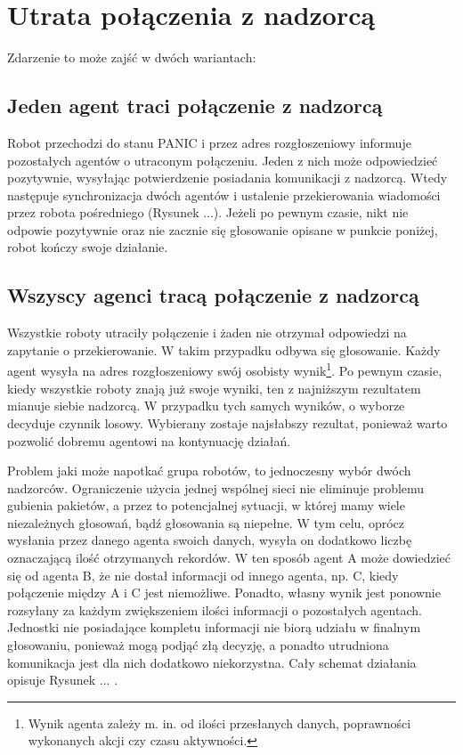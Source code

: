 
\section{Utrata połączenia z nadzorcą}
\label{sec:utrata_polaczenia}

Zdarzenie to może zajść w dwóch wariantach:

\subsection{Jeden agent traci połączenie z nadzorcą}

Robot przechodzi do stanu PANIC i przez adres rozgłoszeniowy informuje pozostałych agentów o utraconym połączeniu. Jeden z nich może odpowiedzieć pozytywnie, wysyłając potwierdzenie posiadania komunikacji z nadzorcą. Wtedy następuje synchronizacja dwóch agentów i ustalenie przekierowania wiadomości przez robota pośredniego (Rysunek ...). Jeżeli po pewnym czasie, nikt nie odpowie pozytywnie oraz nie zacznie się głosowanie opisane w punkcie poniżej, robot kończy swoje działanie.


\subsection{Wszyscy agenci tracą połączenie z nadzorcą}

Wszystkie roboty utraciły połączenie i żaden nie otrzymał odpowiedzi na zapytanie o przekierowanie. W takim przypadku odbywa się głosowanie. Każdy agent wysyła na adres rozgłoszeniowy swój osobisty wynik\footnote{Wynik agenta zależy m. in. od ilości przesłanych danych, poprawności wykonanych akcji czy czasu aktywności.}. Po pewnym czasie, kiedy wszystkie roboty znają już swoje wyniki, ten z najniższym rezultatem mianuje siebie nadzorcą. W przypadku tych samych wyników, o wyborze decyduje czynnik losowy. Wybierany zostaje najsłabszy rezultat, ponieważ warto pozwolić dobremu agentowi na kontynuację działań.

Problem jaki może napotkać grupa robotów, to jednoczesny wybór dwóch nadzorców. Ograniczenie użycia jednej wspólnej sieci nie eliminuje problemu gubienia pakietów, a przez to potencjalnej sytuacji, w której mamy wiele niezależnych głosowań, bądź głosowania są niepełne. W tym celu, oprócz wysłania przez danego agenta swoich danych, wysyła on dodatkowo liczbę oznaczającą ilość otrzymanych rekordów. W ten sposób agent A może dowiedzieć się od agenta B, że nie dostał informacji od innego agenta, np. C, kiedy połączenie między A i C jest niemożliwe. Ponadto, własny wynik jest ponownie rozsyłany za każdym zwiększeniem ilości informacji o pozostałych agentach. Jednostki nie posiadające kompletu informacji nie biorą udziału w finalnym głosowaniu, ponieważ mogą podjąć złą decyzję, a ponadto utrudniona komunikacja jest dla nich dodatkowo niekorzystna. Cały schemat działania opisuje Rysunek ... .

